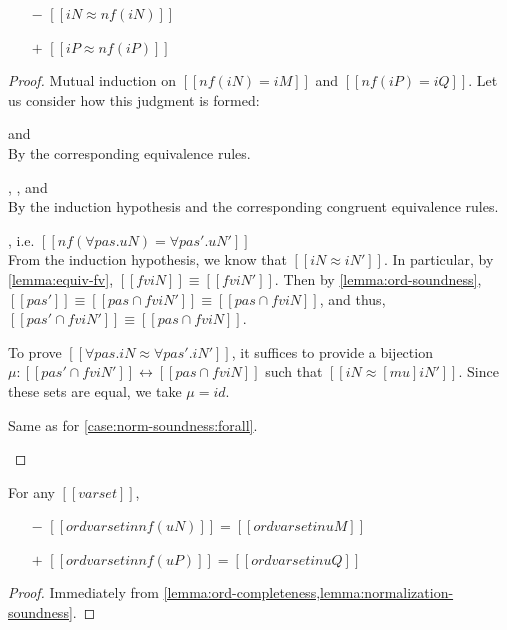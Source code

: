 \begin{lemma}
  \label{lemma:normalization-soundness}
  \hfill
  \begin{itemize}
    \item[$-$] $[[iN ≈ nf(iN)]]$
    \item[$+$] $[[iP ≈ nf(iP)]]$
  \end{itemize}
\end{lemma}
\begin{proof}
  Mutual induction on $[[nf(iN) = iM]]$ and $[[nf(iP) = iQ]]$.
  Let us consider how this judgment is formed:
  \begin{caseof}
    \item{\nameref{\ottdruleNrmNVarLabel} and \nameref{\ottdruleNrmPVarLabel}}\\ By
      the corresponding equivalence rules.
    \item{\nameref{\ottdruleNrmShiftULabel}, \nameref{\ottdruleNrmShiftDLabel},
        and \nameref{\ottdruleNrmArrowLabel}}\\
      By the induction hypothesis and the corresponding congruent equivalence rules.
    \item{\nameref{\ottdruleNrmForallLabel}}, i.e. $[[nf(∀pas.uN) = ∀pas'.uN']]$ \label{case:norm-soundness:forall}\\
      From the induction hypothesis, we
      know that $[[iN ≈ iN']]$. In particular, by \cref{lemma:equiv-fv}, $[[fv
        iN]] \equiv [[fv iN']]$.
      Then by \cref{lemma:ord-soundness}, $[[{pas'}]]
      \equiv [[{pas} ∩ fv iN']] \equiv [[{pas} ∩ fv iN]]$, and thus,
      $[[{pas'} ∩ fv iN']] \equiv [[{pas} ∩ fv iN]]$.
      
      To prove $[[∀pas.iN ≈ ∀pas'.iN']]$, it suffices to provide a bijection 
      $\mu : [[{pas'} ∩ fv iN']] \leftrightarrow [[{pas} ∩ fv iN]]$ such that
      $[[iN ≈ [mu]iN']]$. Since these sets are equal, we take $\mu = id$.
    \item{\nameref{\ottdruleNrmExistsLabel}} Same as for \cref{case:norm-soundness:forall}.
  \end{caseof}
\end{proof}

\begin{corollary}
  \label{corollary:normalization-ord}
  For any $[[varset]]$,
  \begin{itemize}
  \item[$-$] $[[ord varset in nf(uN)]] = [[ord varset in uM]]$
  \item[$+$] $[[ord varset in nf(uP)]] = [[ord varset in uQ]]$
  \end{itemize}
\end{corollary}
\begin{proof}
  Immediately from \cref{lemma:ord-completeness,lemma:normalization-soundness}.
\end{proof}

